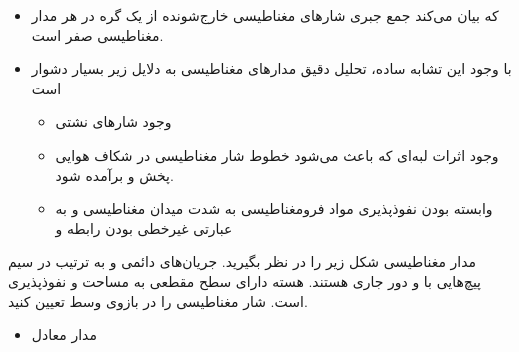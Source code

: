 \begin{ELimportant}{}


\end{ELimportant}

\begin{ELunit}

\begin{itemize}
\tightlist
\item
  که بیان می‌کند جمع جبری شارهای مغناطیسی خارج‌شونده از یک گره در هر مدار مغناطیسی صفر است.
\item
  با وجود این تشابه ساده، تحلیل دقیق مدارهای مغناطیسی به دلایل زیر بسیار دشوار است

  \begin{itemize}
  \tightlist
  \item
    وجود شارهای نشتی
  \item
    وجود اثرات لبه‌ای که باعث می‌شود خطوط شار مغناطیسی در شکاف هوایی پخش و برآمده شود.
  \item
    وابسته بودن نفوذپذیری مواد فرومغناطیسی به شدت میدان مغناطیسی و به عبارتی غیرخطی بودن رابطه  و 
  \end{itemize}
\end{itemize}

\end{ELunit}


\begin{ELexample}{}

مدار مغناطیسی شکل زیر را در نظر بگیرید. جریان‌های دائمی  و  به ترتیب در سیم پیچ‌هایی با  و  دور جاری هستند. هسته دارای سطح مقطعی به مساحت  و نفوذپذیری \ELim{\mu} است. شار مغناطیسی را در بازوی وسط تعیین کنید.


\begin{ELsolution}

\begin{itemize}
\tightlist
\item
  مدار معادل
\end{itemize}



\end{ELsolution}

\end{ELexample}

